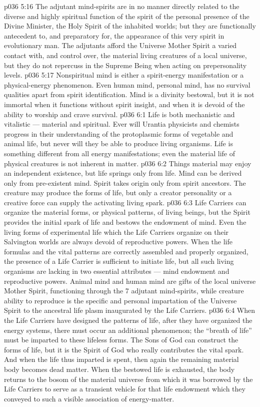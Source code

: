 \vs p036 5:16 The adjutant mind\hyp{}spirits are in no manner directly related to the diverse and highly spiritual function of the spirit of the personal presence of the Divine Minister, the Holy Spirit of the inhabited worlds; but they are functionally antecedent to, and preparatory for, the appearance of this very spirit in evolutionary man. The adjutants afford the Universe Mother Spirit a varied contact with, and control over, the material living creatures of a local universe, but they do not repercuss in the Supreme Being when acting on prepersonality levels.
\vs p036 5:17 \pc Nonspiritual mind is either a spirit\hyp{}energy manifestation or a physical\hyp{}energy phenomenon. Even human mind, personal mind, has no survival qualities apart from spirit identification. Mind is a divinity bestowal, but it is not immortal when it functions without spirit insight, and when it is devoid of the ability to worship and crave survival.
\vs p036 6:1 Life is both mechanistic and vitalistic --- material and spiritual. Ever will Urantia physicists and chemists progress in their understanding of the protoplasmic forms of vegetable and animal life, but never will they be able to produce living organisms. Life is something different from all energy manifestations; even the material life of physical creatures is not inherent in matter.
\vs p036 6:2 Things material may enjoy an independent existence, but life springs only from life. Mind can be derived only from pre\hyp{}existent mind. Spirit takes origin only from spirit ancestors. The creature may produce the forms of life, but only a creator personality or a creative force can supply the activating living spark.
\vs p036 6:3 Life Carriers can organize the material forms, or physical patterns, of living beings, but the Spirit provides the initial spark of life and bestows the endowment of mind. Even the living forms of experimental life which the Life Carriers organize on their Salvington worlds are always devoid of reproductive powers. When the life formulas and the vital patterns are correctly assembled and properly organized, the presence of a Life Carrier is sufficient to initiate life, but all such living organisms are lacking in two essential attributes --- mind endowment and reproductive powers. Animal mind and human mind are gifts of the local universe Mother Spirit, functioning through the 7 adjutant mind\hyp{}spirits, while creature ability to reproduce is the specific and personal impartation of the Universe Spirit to the ancestral life plasm inaugurated by the Life Carriers.
\vs p036 6:4 \pc When the Life Carriers have designed the patterns of life, after they have organized the energy systems, there must occur an additional phenomenon; the “breath of life” must be imparted to these lifeless forms. The Sons of God can construct the forms of life, but it is the Spirit of God who really contributes the vital spark. And when the life thus imparted is spent, then again the remaining material body becomes dead matter. When the bestowed life is exhausted, the body returns to the bosom of the material universe from which it was borrowed by the Life Carriers to serve as a transient vehicle for that life endowment which they conveyed to such a visible association of energy\hyp{}matter.

